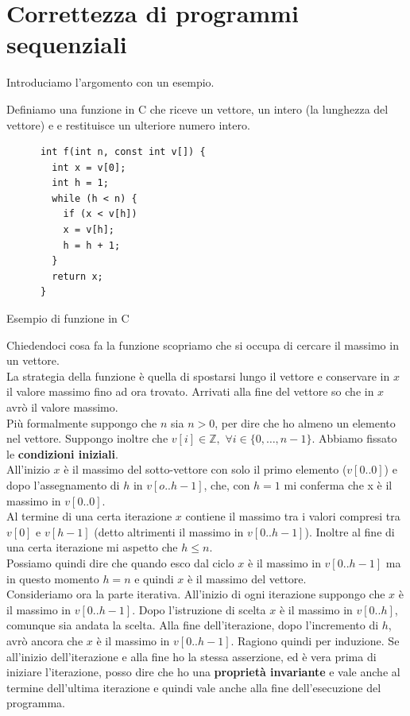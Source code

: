 \documentclass[a4paper,12pt, oneside]{book}
\begin{document}
\chapter{Correttezza di programmi sequenziali}
Introduciamo l'argomento con un esempio.
\begin{esempio}
  Definiamo una funzione in C che riceve un vettore, un intero (la lunghezza del vettore) e
  e restituisce un ulteriore numero intero.
  \begin{listing}[ht]
    \begin{verbatim}
      int f(int n, const int v[]) {
        int x = v[0];
        int h = 1;
        while (h < n) {
          if (x < v[h])
          x = v[h];        
          h = h + 1;
        }
        return x;
      }
    \end{verbatim}
    \caption{Esempio di funzione in C}
    \label{listing:1}
  \end{listing}
  Chiedendoci cosa fa la funzione scopriamo che si occupa di cercare il massimo in
  un vettore.\\
  La strategia della funzione è quella di spostarsi lungo il vettore e
  conservare in $x$ il valore massimo fino ad ora trovato. Arrivati alla fine
  del vettore so che in $x$ avrò il valore massimo.\\
  Più formalmente suppongo che $n$ sia $n > 0$, per dire che ho almeno un
  elemento nel vettore. Suppongo inoltre che $v[i]\in\mathbb{Z},\,\,\forall i\in
  \{0,\ldots, n-1\}$. Abbiamo fissato le \textbf{condizioni iniziali}.\\
  All'inizio $x$ è il massimo del sotto-vettore con solo il primo elemento
  ($v[0..0]$) e dopo l'assegnamento di $h$ in $v[o..h-1]$, che, con $h=1$ mi
  conferma che x è il massimo in $v[0..0]$. \\
  Al termine di una certa iterazione $x$ contiene il massimo 
  tra i valori compresi tra $v[0]$ e $v[h-1]$ (detto altrimenti il massimo in
  $v[0..h-1]$). Inoltre al fine di una certa iterazione mi aspetto che $h\leq
  n$.\\
  Possiamo quindi dire che quando esco dal ciclo $x$ è il massimo in $v[0..h-1]$
  ma in questo momento $h=n$ e quindi $x$ è il massimo del vettore.\\
  Consideriamo ora la parte iterativa. All'inizio di ogni iterazione suppongo
  che $x$ è il massimo in $v[0..h-1]$. Dopo l'istruzione di scelta $x$ è il
  massimo in $v[0..h]$, comunque sia andata la scelta. Alla fine
  dell'iterazione, dopo l'incremento di $h$, avrò ancora che $x$ è il massimo in
  $v[0..h-1]$. Ragiono quindi per induzione. Se all'inizio dell'iterazione e
  alla fine ho la stessa asserzione, ed è vera prima di iniziare l'iterazione,
  posso dire che ho una \textbf{proprietà invariante} e vale anche al termine
  dell'ultima iterazione e quindi vale anche alla fine dell'esecuzione del
  programma. 
\end{esempio}
\end{document}

